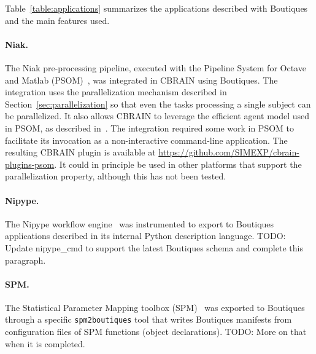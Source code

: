 \documentclass{article}
\newcommand{\todo}[1]{\color{red}TODO: #1\color{black}}
\begin{document}

Table~\ref{table:applications} summarizes the applications described
with Boutiques and the main features used.

\paragraph{Niak.} The Niak pre-processing pipeline, executed with the Pipeline System
for Octave and Matlab (PSOM)~\cite{bellec2012pipeline}, was integrated
in CBRAIN using Boutiques. The integration uses the parallelization
mechanism described in Section~\ref{sec:parallelization} so that even
the tasks processing a single subject can be parallelized. It also
allows CBRAIN to leverage the efficient agent model used in PSOM, as
described in~\cite{GLAT-16}. The integration required some work in
PSOM to facilitate its invocation as a non-interactive command-line
application. The resulting CBRAIN plugin is available at
\url{https://github.com/SIMEXP/cbrain-plugins-psom}. It could in
principle be used in other platforms that support the parallelization
property, although this has not been tested.

\paragraph{Nipype.} The Nipype workflow engine~\cite{gorgolewski2011nipype} was
instrumented to export to Boutiques applications described in its
internal Python description language. \todo{Update nipype\_cmd to
  support the latest Boutiques schema and complete this paragraph.}

\paragraph{SPM.} The Statistical Parameter Mapping toolbox (SPM)~\cite{penny2011statistical}
was exported to Boutiques through a specific \texttt{spm2boutiques}
tool that writes Boutiques manifests from configuration files of SPM
functions (object declarations). \todo{More on that when it is
  completed.}
\end{document}

